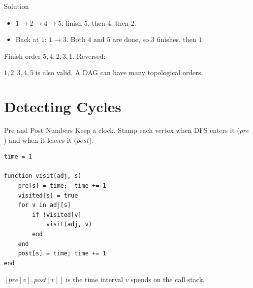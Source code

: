 \documentclass[10pt,aspectratio=169]{beamer}
\begin{document}
\begin{frame}{Solution}
  \begin{itemize}
    \item $1 \to 2 \to 4 \to 5$: finish $5$, then $4$, then $2$.
    \item Back at $1$: $1 \to 3$. Both $4$ and $5$ are done, so $3$
          finishes, then $1$.
  \end{itemize}

  \bigskip
  Finish order $5, 4, 2, 3, 1$. Reversed:
  \begin{center}
  \end{center}

  \bigskip
  \begin{center}
    \small $1, 2, 3, 4, 5$ is also valid. A DAG can have many topological
    orders.
  \end{center}
\end{frame}

\section{Detecting Cycles}

\begin{frame}[fragile]{Pre and Post Numbers}
  Keep a clock. Stamp each vertex when DFS \alert{enters} it ($pre$) and when
  it \alert{leaves} it ($post$).

  \bigskip
\begin{lstlisting}
time = 1

function visit(adj, s)
    pre[s] = time;  time += 1
    visited[s] = true
    for v in adj[s]
        if !visited[v]
            visit(adj, v)
        end
    end
    post[s] = time; time += 1
end
\end{lstlisting}

  \bigskip
  \begin{center}
    $[pre[v], post[v]]$ is the time interval $v$ spends on the call stack.
  \end{center}
\end{frame}
\end{document}
